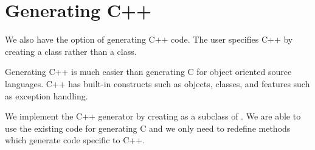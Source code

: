 
\chapter{Generating C++}\label{chap:genCxx}

We also have the option of generating C++ code.  The user specifies
C++ by creating a  class rather than a 
class.  

Generating C++ is much easier than generating C for object oriented
source languages.  C++ has built-in constructs such as objects,
classes, and features such as exception handling.

We implement the C++ generator by creating  as a
subclass of .  We are able to use the existing code for
generating C and we only need to redefine methods which generate code
specific to C++.

